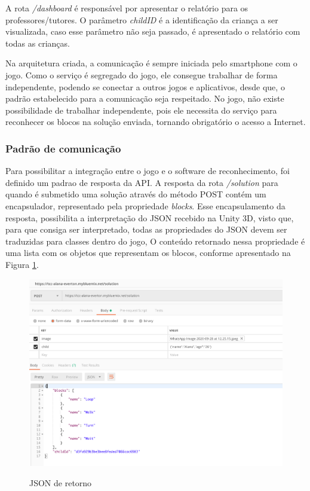     A rota \textit{/dashboard} é responsável por apresentar o relatório para os professores/tutores. O parâmetro \textit{childID} é a identificação da criança a ser visualizada, caso esse parâmetro não seja passado, é apresentado o relatório com todas as crianças.
    
    Na arquitetura criada, a comunicação é sempre iniciada pelo smartphone com o jogo. Como o serviço é segregado do jogo, ele consegue trabalhar de forma independente, podendo se conectar a outros jogos e aplicativos, desde que, o padrão estabelecido para a comunicação seja respeitado. No jogo, não existe possibilidade de trabalhar independente, pois ele necessita do serviço para reconhecer os blocos na solução enviada, tornando obrigatório o acesso a Internet.
    
    \subsubsection{Padrão de comunicação}
    
    Para possibilitar a integração entre o jogo e o software de reconhecimento, foi definido um padrao de resposta da API. A resposta da rota \textit{/solution} para quando é submetido uma solução através do método POST contém um encapsulador, representado pela propriedade \textit{blocks}. Esse encapsulamento da resposta, possibilita a interpretação do JSON recebido na Unity 3D, visto que, para que consiga ser interpretado, todas as propriedades do JSON devem ser traduzidas para classes dentro do jogo, O conteúdo retornado nessa propriedade é uma lista com os objetos que representam os blocos, conforme apresentado na Figura \ref{figura:json_retorno}.
    
    \begin{figure}[H]
        \caption{JSON de retorno}
        \centering
        \includegraphics[width=\linewidth]{Imagens/Cap4/json_retorno.png}
        \label{figura:json_retorno}
    \end{figure}
    
